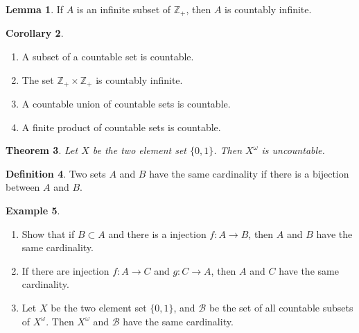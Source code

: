 \documentclass{beamer}
\theoremstyle{plain}
\newtheorem{thm}{Theorem}[section]
\theoremstyle{definition}
\newtheorem{defn}[thm]{Definition}
\newtheorem{exmp}[thm]{Example}
\newtheorem{cor}[thm]{Corollary}
\newtheorem{lem}[thm]{Lemma}
\begin{document}
\begin{frame}
\begin{lem}
	If $A$ is an infinite subset of $\mathbb Z_+$,
	then $A$ is countably infinite.
\end{lem}
\begin{cor}
	\begin{enumerate}
		\item A subset of a countable set is countable.
		\item The set $\mathbb Z_+\times \mathbb Z_+$
		is countably infinite.
		\item A countable union of countable sets
		is countable.
		\item A finite product of countable sets
		is countable.
	\end{enumerate}
\end{cor}
\begin{thm}
	Let $X$ be the two element set $\{0,1\}$.
	Then $X^\omega$ is uncountable.
\end{thm}
\end{frame}

\begin{frame}
\begin{defn}
	Two sets $A$ and $B$ have the same cardinality
	if there is a bijection between $A$ and $B$.
\end{defn}
\begin{exmp}
	\begin{enumerate}
		\item Show that if $B\subset A$ and 
		there is a injection $f:A\to B$,
		then $A$ and $B$ have the same cardinality.
		\item If there are injection $f:A\to C$
		and $g:C\to A$, then $A$ and $C$ have the
		same cardinality.
		\item Let $X$ be the two element set $\{0,1\}$,
		and $\mathcal B$ be the set of all countable 
		subsets of $X^\omega$. Then $X^\omega$
		and $\mathcal B$ have the same cardinality.
	\end{enumerate}
\end{exmp}
\end{frame}
\end{document}

